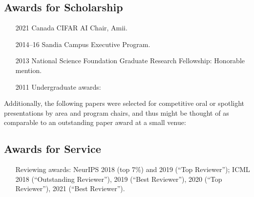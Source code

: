 \documentclass[10pt]{article}
\begin{document}
\subsection{Awards for Scholarship} %

\begin{itemize}[leftmargin=5em]
  \item[2021] {Canada CIFAR AI Chair, Amii. } %

  \item[2014--16] Sandia Campus Executive Program. 
  \item[2013] National Science Foundation Graduate Research Fellowship: Honorable mention.
  \item[2011] Undergraduate awards: 
\end{itemize}

Additionally, the following papers were selected for competitive oral or spotlight presentations by area and program chairs,
and thus might be thought of as comparable to an outstanding paper award at a small venue:
\begin{itemize}[leftmargin=5em]
  
\end{itemize}

\subsection{Awards for Service} %
\begin{itemize}
  \item[] Reviewing awards: NeurIPS 2018 (top 7\%) and 2019 (``Top Reviewer''); ICML 2018 (``Outstanding Reviewer''), 2019 (``Best Reviewer''), 2020 (``Top Reviewer''), 2021 (``Best Reviewer'').
\end{itemize}
\end{document}
